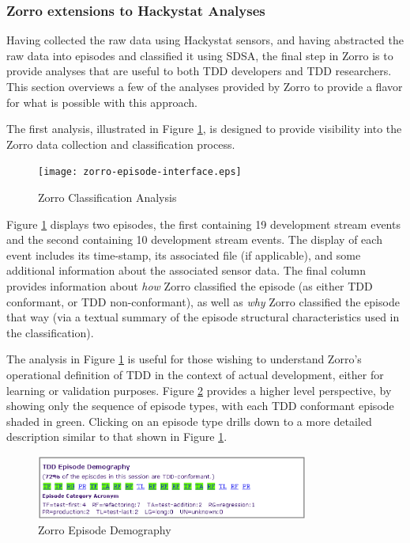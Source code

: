\documentclass[smallextended]{svjour3}     %
\begin{document}
\subsubsection{Zorro extensions to Hackystat Analyses}

Having collected the raw data using Hackystat sensors, and having
abstracted the raw data into episodes and classified it using SDSA, the
final step in Zorro is to provide analyses that are useful to both TDD
developers and TDD researchers.  This section overviews a few of the
analyses provided by Zorro to provide a flavor for what is possible with
this approach.

The first analysis, illustrated in Figure \ref{fig:Analysis-Table}, is
designed to provide visibility into the Zorro data collection and
classification process.

\begin{figure}[th]
  \center
  \texttt{[image: zorro-episode-interface.eps]}
  \caption{Zorro Classification Analysis}
  \label{fig:Analysis-Table}
\end{figure} 

Figure \ref{fig:Analysis-Table} displays two episodes, the first containing
19 development stream events and the second containing 10 development
stream events.  The display of each event includes its time-stamp, its
associated file (if applicable), and some additional information about the
associated sensor data.  The final column provides information about {\em
how} Zorro classified the episode (as either TDD conformant, or TDD
non-conformant), as well as {\em why} Zorro classified the episode that way
(via a textual summary of the episode structural characteristics used in
the classification).  

The analysis in Figure \ref{fig:Analysis-Table} is useful for those wishing
to understand Zorro's operational definition of TDD in the context of
actual development, either for learning or validation purposes.  Figure
\ref{fig:Analysis-Demography} provides a higher level perspective, by
showing only the sequence of episode types, with each TDD conformant
episode shaded in green. Clicking on an episode type drills down to a more
detailed description similar to that shown in Figure
\ref{fig:Analysis-Table}.

\begin{figure}[th]
  \center
  \includegraphics[width=0.80\textwidth]{zorro-episode-demography.eps}
  \caption{Zorro Episode Demography}
  \label{fig:Analysis-Demography}
\end{figure} 
\end{document}
